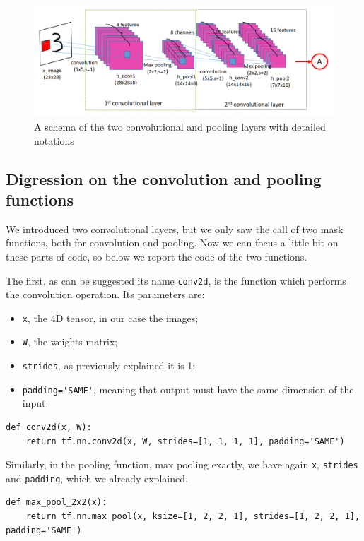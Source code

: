\begin{figure}
	\centering
	\includegraphics[width=1\textwidth]{Images/conv_layers}
	\caption{A schema of the two convolutional and pooling layers with detailed notations}
	\label{fig:conv_layers}
\end{figure}

\subsection{Digression on the convolution and pooling functions}

We introduced two convolutional layers, but we only saw the call of two mask functions, both for convolution and pooling. Now we can focus a little bit on these parts of code, so below we report the code of the two functions.

The first, as can  be suggested its name \lstinline|conv2d|, is the function which performs the convolution operation. Its parameters are:

\begin{itemize}
	\item \lstinline|x|, the 4D tensor, in our case the images;
	\item \lstinline|W|, the weights matrix;
	\item \lstinline|strides|, as previously explained it is 1;
	\item \lstinline|padding='SAME'|, meaning that output must have the same dimension of the input.
\end{itemize}

\begin{lstlisting}
def conv2d(x, W):
	return tf.nn.conv2d(x, W, strides=[1, 1, 1, 1], padding='SAME')
\end{lstlisting}

Similarly, in the pooling function, max pooling exactly, we have again \lstinline|x|, \lstinline|strides| and \lstinline|padding|, which we already explained.

\begin{lstlisting}
def max_pool_2x2(x):
	return tf.nn.max_pool(x, ksize=[1, 2, 2, 1], strides=[1, 2, 2, 1], padding='SAME')
\end{lstlisting}

